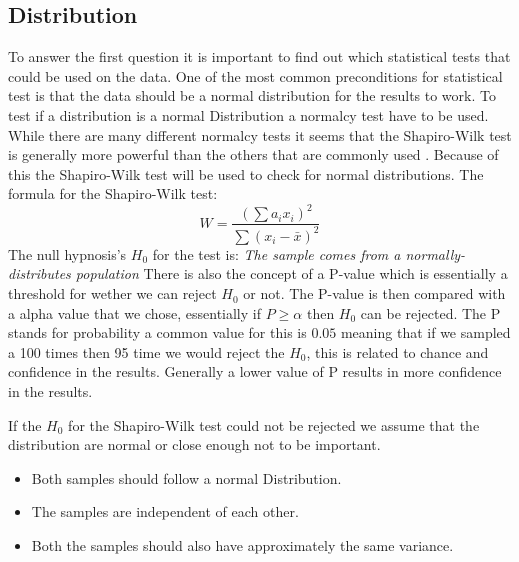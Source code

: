 \subsection{Distribution}
To answer the first question it is important to find out which statistical tests that could be used on the data. One of the most common preconditions for statistical test is that the data should be a normal distribution for the results to work. To test if a distribution is a normal Distribution a normalcy test have to be used. While there are many different normalcy tests it seems that the Shapiro-Wilk test is generally more powerful than the others that are commonly used \cite{razali2011power}. Because of this the Shapiro-Wilk test will be used to check for normal distributions. The formula for the Shapiro-Wilk test:
$$W=\frac{( \sum{a_i x_i} )^2}{\sum{(x_i - \bar{x})^2}}$$
The null hypnosis's $H_0$ for the test is:
\textit{The sample comes from a normally-distributes population}
There is also the concept of a P-value which is essentially a threshold for wether we can reject $H_0$ or not. The P-value is then compared with a alpha value that we chose, essentially if $P \geq \alpha$ then $H_0$ can be rejected. The P stands for probability a common value for this is $0.05$ meaning that if we sampled a 100 times then 95 time we would reject the $H_0$, this is related to chance and confidence in the results. Generally a lower value of P results in more confidence in the results.

If the $H_0$ for the Shapiro-Wilk test could not be rejected we assume that the distribution are normal or close enough not to be important.


\begin{itemize}
    \item Both samples should follow a normal Distribution.
    \item The samples are independent of each other.
    \item Both the samples should also have approximately the same variance.
\end{itemize}